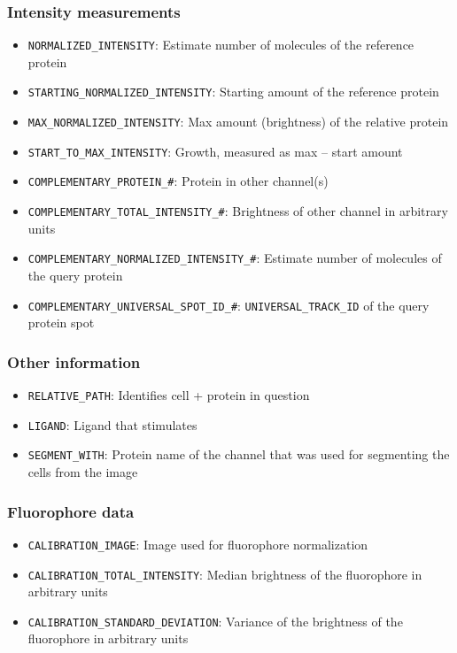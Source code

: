 \subsubsection{Intensity measurements}
\begin{itemize}
\item \texttt{NORMALIZED\_INTENSITY}: Estimate number of molecules of the reference protein
\item \texttt{STARTING\_NORMALIZED\_INTENSITY}: Starting amount of the reference protein
\item \texttt{MAX\_NORMALIZED\_INTENSITY}: Max amount (brightness) of the relative protein
\item \texttt{START\_TO\_MAX\_INTENSITY}: Growth, measured as max -- start amount
\item \texttt{COMPLEMENTARY\_PROTEIN\_\#}: Protein in other channel(s)
\item \texttt{COMPLEMENTARY\_TOTAL\_INTENSITY\_\#}: Brightness of other channel in arbitrary units
\item \texttt{COMPLEMENTARY\_NORMALIZED\_INTENSITY\_\#}: Estimate number of molecules of the query protein
\item \texttt{COMPLEMENTARY\_UNIVERSAL\_SPOT\_ID\_\#}: \texttt{UNIVERSAL\_TRACK\_ID} of the query protein spot
\end{itemize}

\subsubsection{Other information}
\begin{itemize}
    \item \texttt{RELATIVE\_PATH}: Identifies cell + protein in question
    \item \texttt{LIGAND}: Ligand that stimulates 
    \item \texttt{SEGMENT\_WITH}: Protein name of the channel that was used for segmenting the cells from the image
\end{itemize}

\subsubsection{Fluorophore data}
\begin{itemize}
    \item \texttt{CALIBRATION\_IMAGE}: Image used for fluorophore normalization
    \item \texttt{CALIBRATION\_TOTAL\_INTENSITY}: Median brightness of the fluorophore in arbitrary units
    \item \texttt{CALIBRATION\_STANDARD\_DEVIATION}: Variance of the brightness of the fluorophore in arbitrary units
\end{itemize}

